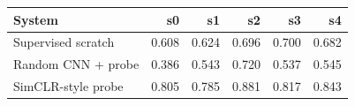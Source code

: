 \begin{tabular}{lrrrrr}
\toprule
System & s0 & s1 & s2 & s3 & s4 \\
\midrule
Supervised scratch & 0.608 & 0.624 & 0.696 & 0.700 & 0.682 \\
Random CNN + probe & 0.386 & 0.543 & 0.720 & 0.537 & 0.545 \\
SimCLR-style probe & 0.805 & 0.785 & 0.881 & 0.817 & 0.843 \\
\bottomrule
\end{tabular}
